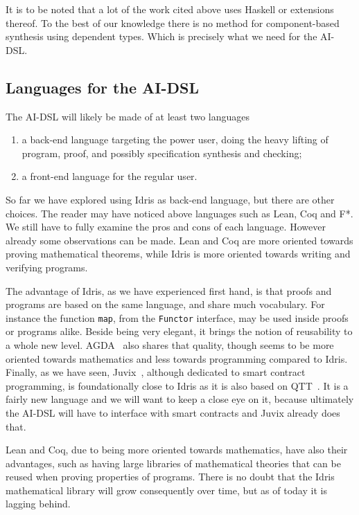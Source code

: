 \documentclass[]{report}
\begin{document}
It is to be noted that a lot of the work cited above uses Haskell or
extensions thereof.  To the best of our knowledge there is no method
for component-based synthesis using dependent types.  Which is
precisely what we need for the AI-DSL.

\subsection{Languages for the AI-DSL}
\label{subsec:languages_aidsl}

The AI-DSL will likely be made of at least two languages
\begin{enumerate}
\item a back-end language targeting the power user, doing the heavy
  lifting of program, proof, and possibly specification synthesis and
  checking;
\item a front-end language for the regular user.
\end{enumerate}
So far we have explored using Idris as back-end language, but there
are other choices.  The reader may have noticed above languages such
as Lean, Coq and F*.  We still have to fully examine the pros and cons
of each language.  However already some observations can be made.
Lean and Coq are more oriented towards proving mathematical theorems,
while Idris is more oriented towards writing and verifying programs.

The advantage of Idris, as we have experienced first hand, is that
proofs and programs are based on the same language, and share much
vocabulary.  For instance the function \texttt{map}, from the
\texttt{Functor} interface, may be used inside proofs or programs
alike.  Beside being very elegant, it brings the notion of reusability
to a whole new level.  AGDA~\cite{Norell2009} also shares that
quality, though seems to be more oriented towards mathematics and less
towards programming compared to Idris.  Finally, as we have seen,
Juvix~\cite{Goes2020}, although dedicated to smart contract
programming, is foundationally close to Idris as it is also based on
QTT~\cite{Atkey2018}.  It is a fairly new language and we will want to
keep a close eye on it, because ultimately the AI-DSL will have to
interface with smart contracts and Juvix already does that.

Lean and Coq, due to being more oriented towards mathematics, have
also their advantages, such as having large libraries of mathematical
theories that can be reused when proving properties of programs.
There is no doubt that the Idris mathematical library will grow
consequently over time, but as of today it is lagging behind.
\end{document}

